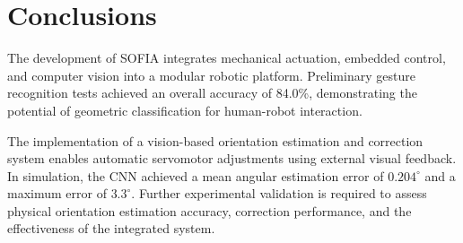 \documentclass[lettersize,journal]{IEEEtran}
\begin{document}
	
	
	\section{Conclusions}
	\label{sec:conclusions}

	The development of SOFIA integrates mechanical actuation,
	embedded control, and computer vision into a modular
	robotic platform. Preliminary gesture recognition tests
	achieved an overall accuracy of 84.0\%, demonstrating
	the potential of geometric classification for human-robot
	interaction.

	The implementation of a vision-based orientation estimation
	and correction system enables automatic servomotor
	adjustments using external visual feedback. In simulation,
	the CNN achieved a mean angular estimation error of
	$0.204^\circ$ and a maximum error of $3.3^\circ$.
	Further experimental validation is required to assess
	physical orientation estimation accuracy, correction
	performance, and the effectiveness of the integrated system.
		
	\balance
	
	
	
	
\end{document}
